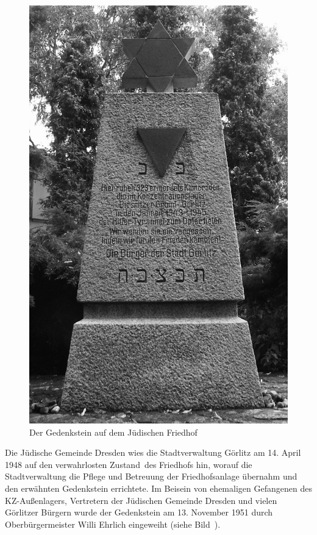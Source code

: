 \begin{figure}[htb]
\begin{minipage}[t]{0.47\linewidth}
        \includegraphics[width=\linewidth]{images/nk03}
        \caption{Der Gedenkstein auf dem Jüdischen Friedhof}
        \label{judfried}
    \end{minipage}
\end{figure}



Die Jüdische Gemeinde Dresden wies die Stadtverwaltung Görlitz am 14. April 1948 auf den \glqq verwahrlosten Zustand\grqq~des Friedhofs hin, worauf die Stadtverwaltung die Pflege und Betreuung der Friedhofsanlage übernahm und den erwähnten Gedenkstein errichtete.
Im Beisein von ehemaligen Gefangenen des KZ-Außenlagers, Vertretern der Jüdischen Gemeinde Dresden und vielen Görlitzer Bürgern wurde der Gedenkstein am 13. November 1951 durch Oberbürgermeister Willi Ehrlich eingeweiht (siehe Bild~). 



